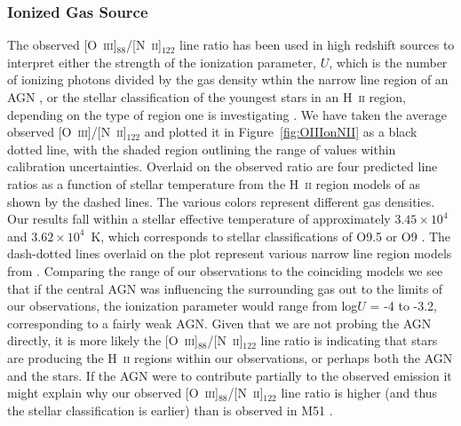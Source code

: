 \documentclass[preprint2]{aastex}
\begin{document}
\subsubsection{Ionized Gas Source}\label{oiiionnii}
The observed [O~\textsc{iii}]$_{88}$/[N~\textsc{ii}]$_{122}$ line ratio has been used in high redshift sources to interpret either the strength of the ionization parameter, $U$, which is the number of ionizing photons divided by the gas density wthin the narrow line region of an AGN \citep{2009ApJ...701.1147A}, or the stellar classification of the youngest stars in an H~\textsc{ii} region, depending on the type of region one is investigating \citep{2011ApJ...740L..29F}.  We have taken the average observed [O~\textsc{iii}]/[N~\textsc{ii}]$_{122}$ and plotted it in Figure~\ref{fig:OIIIonNII} as a black dotted line, with the shaded region outlining the range of values within calibration uncertainties.  Overlaid on the observed ratio are four predicted line ratios as a function of stellar temperature from the H~\textsc{ii} region models of \citet{1985ApJS...57..349R} as shown by the dashed lines.  The various colors represent different gas densities.  Our results fall within a stellar effective temperature of approximately $3.45 \times 10^{4}$ and $3.62 \times 10^{4}$~K, which corresponds to stellar classifications of O9.5 or O9 \citep{1996ApJ...460..914V}.  The dash-dotted lines overlaid on the plot represent various narrow line region models from \citet{2004ApJS..153....9G}.  Comparing the range of our observations to the coinciding models we see that if the central AGN was influencing the surrounding gas out to the limits of our observations, the ionization parameter would range from log$U$ = -4 to -3.2, corresponding to a fairly weak AGN.  Given that we are not probing the AGN directly, it is more likely the [O~\textsc{iii}]$_{88}$/[N~\textsc{ii}]$_{122}$ line ratio is indicating that stars are producing the H~\textsc{ii} regions within our observations, or perhaps both the AGN and the stars.  If the AGN were to contribute partially to the observed emission it might explain why our observed [O~\textsc{iii}]$_{88}$/[N~\textsc{ii}]$_{122}$ line ratio is higher (and thus the stellar classification is earlier) than is observed in M51 \citep{parkin_2013}.
\end{document}
